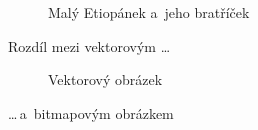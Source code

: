 \documentclass[11pt]{article}
\begin{document}
\begin{figure}[h]
\begin{center}
{    }
    \caption{Malý Etiopánek a~jeho bratříček}
    \label{img:etiopan}
\end{center}
\end{figure}

Rozdíl mezi vektorovým \dots

\begin{figure}[h]
\begin{center}
    \caption{Vektorový obrázek}
    \label{img:vektor}
\end{center}
\end{figure}
\noindent \dots\,a~bitmapovým obrázkem
\end{document}
